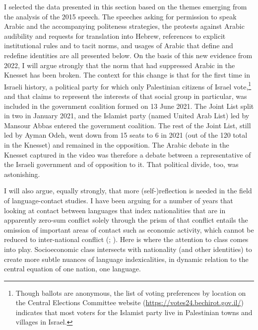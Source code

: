 \documentclass[output=paper,arabicfont]{langscibook}
\begin{document}
I selected the data presented in this section based on the themes emerging from the analysis of the 2015 speech. The speeches asking for permission to speak Arabic and the accompanying politeness strategies, the protests against Arabic audibility and requests for translation into Hebrew, references to explicit institutional rules and to tacit norms, and usages of Arabic that define and redefine identities are all presented below. On the basis of this new evidence from 2022, I will argue strongly that the norm that had suppressed Arabic in the Knesset has been broken. The context for this change is that for the first time in Israeli history, a political party for which only Palestinian citizens of Israel vote,\footnote{Though ballots are anonymous, the list of voting preferences by location on the Central Elections Committee website (\url{https://votes24.bechirot.gov.il/}) indicates that most voters for the Islamist party live in Palestinian towns and villages in Israel.} and that claims to represent the interests of that social group in particular, was included in the government coalition formed on 13 June 2021. The Joint List split in two in January 2021, and the Islamist party (named United Arab List) led by Mansour Abbas entered the government coalition. The rest of the Joint List, still led by Ayman Odeh, went down from 15 seats to 6 in 2021 (out of the 120 total in the Knesset) and remained in the opposition. The Arabic debate in the Knesset captured in the video was therefore a debate between a representative of the Israeli government and of opposition to it. That political divide, too, was astonishing.

I will also argue, equally strongly, that more (self-)reflection is needed in the field of language-contact studies. I have been arguing for a number of years that looking at contact between languages that index nationalities that are in apparently zero-sum conflict solely through the prism of that conflict entails the omission of important areas of contact such as economic activity, which cannot be reduced to inter-national conflict (\citealt{hawker2018a}; \citealt{heller2015a}). Here is where the attention to class comes into play. Socioeconomic class intersects with nationality (and other identities) to create more subtle nuances of language indexicalities, in dynamic relation to the central equation of one nation, one language. 
\end{document}
